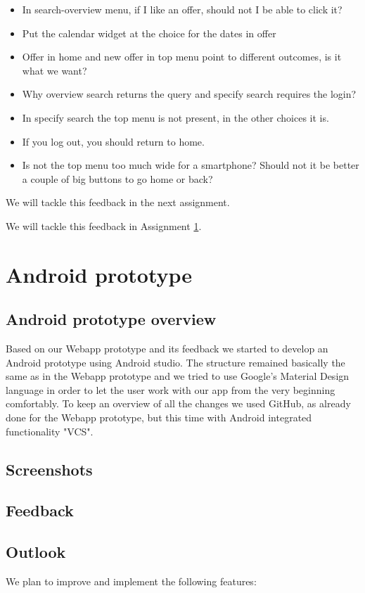 \documentclass[11pt,twoside,a4paper]{report}
\begin{document}
\begin{itemize}

\item In search-overview menu, if I like an offer, should not I be able to click it?

\item Put the calendar widget at the choice for the dates in offer

\item Offer in home and new offer in top menu point to different outcomes, is it what we want?

\item Why overview search returns the query and specify search requires the login?

\item In specify search the top menu is not present, in the other choices it is.

\item If you log out, you should return to home.

\item Is not the top menu too much wide for a smartphone? Should not it be better a couple of big buttons to go home or back?

\end{itemize}

We will tackle this feedback in the next assignment.

We will tackle this feedback in Assignment \ref{assignment:android-prototype}.

\chapter{Android prototype}
\label{assignment:android-prototype}

\section{Android prototype overview}
Based on our Webapp prototype and its feedback we started to develop an Android prototype using Android studio. The structure remained basically the same as in the Webapp prototype and we tried to use Google’s Material Design language in order to let the user work with our app from the very beginning comfortably. To keep an overview of all the changes we used GitHub, as already done for the Webapp prototype, but this time with Android integrated functionality "VCS".


\section{Screenshots}

\section{Feedback}

\section{Outlook}

We plan to improve and implement the following features:
\end{document}
